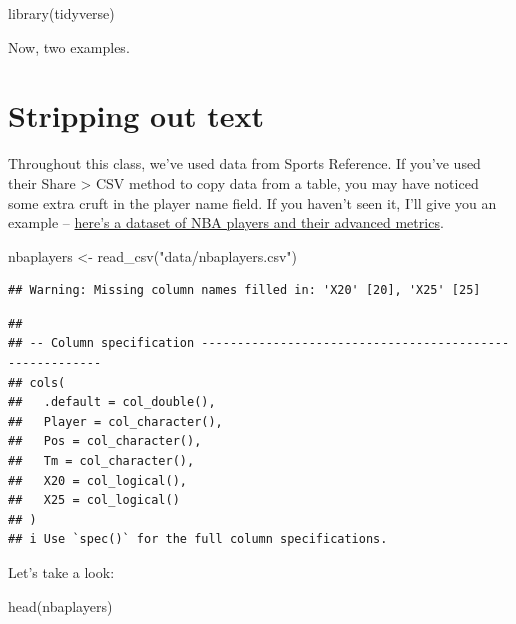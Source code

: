 \documentclass[
]{book}
\newenvironment{Shaded}{\begin{snugshade}}{\end{snugshade}}
\newcommand{\FunctionTok}[1]{\textcolor[rgb]{0.00,0.00,0.00}{#1}}
\newcommand{\NormalTok}[1]{#1}
\newcommand{\OtherTok}[1]{\textcolor[rgb]{0.56,0.35,0.01}{#1}}
\newcommand{\StringTok}[1]{\textcolor[rgb]{0.31,0.60,0.02}{#1}}
\begin{document}
\begin{Shaded}
\begin{Highlighting}[]
\FunctionTok{library}\NormalTok{(tidyverse)}
\end{Highlighting}
\end{Shaded}

Now, two examples.

\hypertarget{stripping-out-text}{%
\section{Stripping out text}\label{stripping-out-text}}

Throughout this class, we've used data from Sports Reference. If you've used their Share \textgreater{} CSV method to copy data from a table, you may have noticed some extra cruft in the player name field. If you haven't seen it, I'll give you an example -- \href{https://unl.box.com/s/bx89eg0ooccpovm3ii7jnbjj3xaby2qd}{here's a dataset of NBA players and their advanced metrics}.

\begin{Shaded}
\begin{Highlighting}[]
\NormalTok{nbaplayers }\OtherTok{\textless{}{-}} \FunctionTok{read\_csv}\NormalTok{(}\StringTok{"data/nbaplayers.csv"}\NormalTok{)}
\end{Highlighting}
\end{Shaded}

\begin{verbatim}
## Warning: Missing column names filled in: 'X20' [20], 'X25' [25]
\end{verbatim}

\begin{verbatim}
## 
## -- Column specification --------------------------------------------------------
## cols(
##   .default = col_double(),
##   Player = col_character(),
##   Pos = col_character(),
##   Tm = col_character(),
##   X20 = col_logical(),
##   X25 = col_logical()
## )
## i Use `spec()` for the full column specifications.
\end{verbatim}

Let's take a look:

\begin{Shaded}
\begin{Highlighting}[]
\FunctionTok{head}\NormalTok{(nbaplayers)}
\end{Highlighting}
\end{Shaded}
\end{document}
